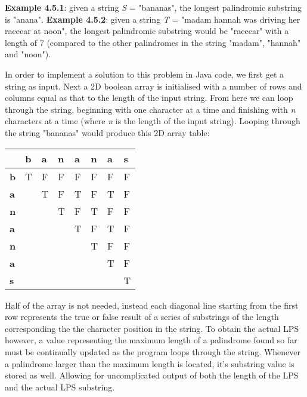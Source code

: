 \medbreak
\textbf{Example 4.5.1}: given a string \textit{S} = "bananas", the longest palindromic substring is "anana".
\smallbreak
\textbf{Example 4.5.2}: given a string \textit{T} = "madam hannah was driving her racecar at noon", the longest palindromic substring would be "racecar" with a length of 7 (compared to the other palindromes in the string "madam", "hannah" and "noon").

\medbreak\noindent
In order to implement a solution to this problem in Java code, we first get a string as input. Next a 2D boolean array is initialised with a number of rows and columns equal as that to the length of the input string. From here we can loop through the string, beginning with one character at a time and finishing with \textit{n} characters at a time (where \textit{n} is the length of the input string). Looping through the string "bananas" would produce this 2D array table:

\begin{table}[h]
	\centering
	\begin{tabular}{|l|l|l|l|l|l|l|l|}
		\hline
		& \textbf{b} & \textbf{a} & \textbf{n} & \textbf{a} & \textbf{n} & \textbf{a} & \textbf{s} \\ \hline
		\textbf{b} & T & F & F & F & F & F & F \\ \hline
		\textbf{a} &  & T & F & T & F & T & F \\ \hline
		\textbf{n} &  &  & T & F & T & F & F \\ \hline
		\textbf{a} &  &  &  & T & F & T & F \\ \hline
		\textbf{n} &  &  &  &  & T & F & F \\ \hline
		\textbf{a} &  &  &  &  &  & T & F \\ \hline
		\textbf{s} &  &  &  &  &  &  & T \\ \hline
	\end{tabular}
\end{table}

Half of the array is not needed, instead each diagonal line starting from the first row represents the true or false result of a series of substrings of the length corresponding the the character position in the string. To obtain the actual LPS however, a value representing the maximum length of a palindrome found so far must be continually updated as the program loops through the string. Whenever a palindrome larger than the maximum length is located, it's substring value is stored as well. Allowing for uncomplicated output of both the length of the LPS and the actual LPS substring.

